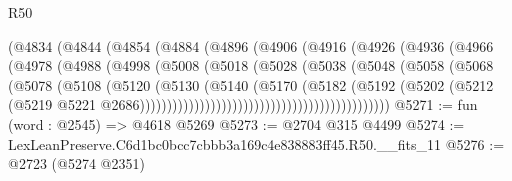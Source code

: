 \begin{lexlean}{R50}
\begin{coremodule}
                                  (@4834
                                    (@4844
                                      (@4854
                                        (@4884
                                          (@4896
                                            (@4906
                                              (@4916
                                                (@4926
                                                  (@4936
                                                    (@4966
                                                      (@4978
                                                        (@4988
                                                          (@4998
                                                            (@5008
                                                              (@5018
                                                                (@5028
                                                                  (@5038
                                                                    (@5048
                                                                      (@5058
                                                                        (@5068
                                                                          (@5078
                                                                            (@5108
                                                                              (@5120
                                                                                (@5130
                                                                                  (@5140
                                                                                    (@5170
                                                                                      (@5182
                                                                                        (@5192
                                                                                          (@5202
                                                                                            (@5212
                                                                                              (@5219
                                                                                                @5221
                                                                                                @2686))))))))))))))))))))))))))))))))))))))))))))))
@5271 := fun (word : @2545) => @4618 @5269
@5273 := @2704 @315 @4499
@5274 := LexLeanPreserve.C6d1bc0bcc7cbbb3a169c4e838883ff45.R50.__fits_11
@5276 := @2723 (@5274 @2351)

\end{coremodule}
\end{lexlean}
